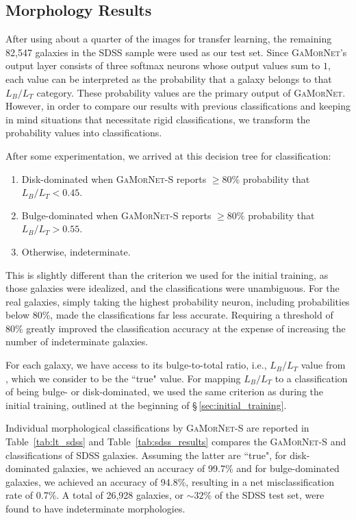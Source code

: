 \documentclass[twocolumn]{aastex63}
\newcommand\gamornet{G\textsc{a}M\textsc{or}N\textsc{et}}
\begin{document}
\subsection{Morphology Results}\label{sec:morph_results}
After using about a quarter of the images for transfer learning, the remaining 82,547 galaxies in the SDSS sample were used as our test set. Since \gamornet{}'s output layer consists of three softmax neurons whose output values sum to $1$, each value can be interpreted as the probability that a galaxy belongs to that $L_B/L_T$ category. These probability values are the primary output of \gamornet{}. However, in order to compare our results with previous classifications and keeping in mind situations that necessitate rigid classifications, we transform the probability values into classifications.

After some experimentation, we arrived at this decision tree for classification:
\begin{enumerate}[noitemsep]
\item Disk-dominated when \gamornet{}-S reports $\geq 80\%$ probability that $L_B/L_T < 0.45$.
\item Bulge-dominated when \gamornet{}-S reports $\geq 80\%$ probability that $L_B/L_T > 0.55$.
\item Otherwise, indeterminate.
\end{enumerate}
This is slightly different than the criterion we used for the initial training, as those galaxies were idealized, and the classifications were unambiguous. For the real galaxies, simply taking the highest probability neuron, including probabilities below 80\%, made the classifications far less accurate. Requiring a threshold of 80\% greatly improved the classification accuracy at the expense of increasing the number of indeterminate galaxies.


For each galaxy, we have access to its bulge-to-total ratio, i.e., $L_B/L_T$ value from \citet{simard_11}, which we consider to be the ``true" value. For mapping $L_B/L_T$ to a classification of being bulge- or disk-dominated, we used the same criterion as during the initial training, outlined at the beginning of \S\,\ref{sec:initial_training}.

Individual morphological classifications by \gamornet{}-S are reported in Table~\ref{tab:lt_sdss} and Table~\ref{tab:sdss_results} compares the \gamornet{}-S and \citet{simard_11} classifications of SDSS galaxies. Assuming the latter are ``true", for disk-dominated galaxies, we achieved an accuracy of 99.7\% and for bulge-dominated galaxies, we achieved an accuracy of 94.8\%, resulting in a net misclassification rate of 0.7\%. A total of 26,928 galaxies, or $\sim 32$\% of the SDSS test set, were found to have indeterminate morphologies.
\end{document}
